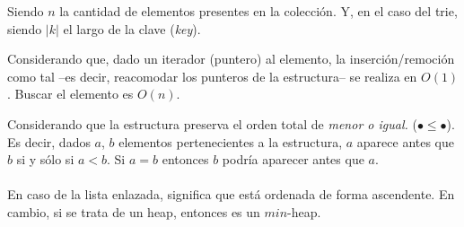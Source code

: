 \documentclass{article}
\begin{document}
Siendo $n$ la cantidad de elementos presentes en la colección. Y, en el caso del trie, siendo $|k|$ el largo de la clave (\textit{key}).

\vfill

{\label{uno} \setlength{\parindent}{-1mm} 
\daga Considerando que, dado un iterador (puntero) al elemento, la inserción/remoción como tal --es decir, reacomodar los punteros de la estructura-- se realiza en $O(1)$. Buscar el elemento es $O(n)$.}

\par
\vspace{5mm}

{\label{dos} \setlength{\parindent}{-1mm} 
\ddaga Considerando que la estructura preserva el orden total de \textit{menor o igual.} ($\bullet \leqslant \bullet $). Es decir, dados $a$, $b$ elementos pertenecientes a la estructura, $a$ aparece antes que $b$ si y sólo si $a < b$. Si $a = b$ entonces $b$ podría aparecer antes que $a$. 
\\ \\
En caso de la lista enlazada, significa que está ordenada de forma ascendente. En cambio, si se trata de un heap, entonces es un $min$-heap.
}

\hypersetup{
    colorlinks,
    citecolor=blue,
    filecolor=blue,
    linkcolor=blue,
    urlcolor=blue
}
\end{document}
